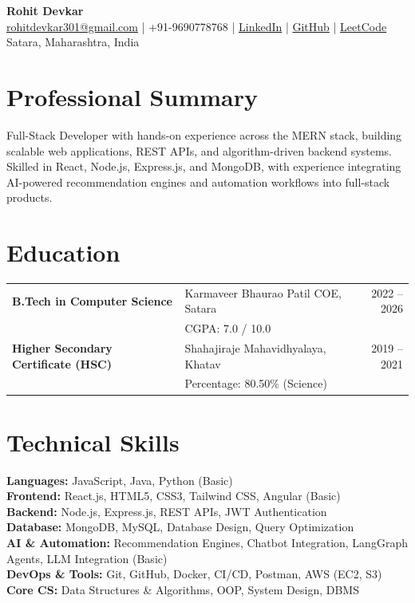 \documentclass[10pt,a4paper]{article}
\begin{document}
\begin{center}
    {\LARGE \textbf{Rohit Devkar}} \\
    \href{mailto:rohitdevkar301@gmail.com}{rohitdevkar301@gmail.com} \;|\;
    +91-9690778768 \;|\;
    \href{https://www.linkedin.com/in/rohitdevkar}{LinkedIn} \;|\;
    \href{https://github.com/Ro-hit16}{GitHub} \;|\;
    \href{https://leetcode.com/Rohitdevkar}{LeetCode} \\
    Satara, Maharashtra, India
\end{center}

\section*{Professional Summary}
Full-Stack Developer with hands-on experience across the MERN stack, building scalable web applications, REST APIs, and algorithm-driven backend systems. Skilled in React, Node.js, Express.js, and MongoDB, with experience integrating AI-powered recommendation engines and automation workflows into full-stack products.

\section*{Education}
\begin{tabularx}{\textwidth}{@{} l X r @{}}
\textbf{B.Tech in Computer Science} & Karmaveer Bhaurao Patil COE, Satara & 2022 -- 2026 \\
 & CGPA: 7.0 / 10.0 & \\[0.1em]
\textbf{Higher Secondary Certificate (HSC)} & Shahajiraje Mahavidhyalaya, Khatav & 2019 -- 2021 \\
 & Percentage: 80.50\% (Science) & \\
\end{tabularx}

\section*{Technical Skills}
\textbf{Languages:} JavaScript, Java, Python (Basic) \\
\textbf{Frontend:} React.js, HTML5, CSS3, Tailwind CSS, Angular (Basic) \\
\textbf{Backend:} Node.js, Express.js, REST APIs, JWT Authentication \\
\textbf{Database:} MongoDB, MySQL, Database Design, Query Optimization \\
\textbf{AI \& Automation:} Recommendation Engines, Chatbot Integration, LangGraph Agents, LLM Integration (Basic) \\
\textbf{DevOps \& Tools:} Git, GitHub, Docker, CI/CD, Postman, AWS (EC2, S3) \\
\textbf{Core CS:} Data Structures \& Algorithms, OOP, System Design, DBMS
\end{document}
